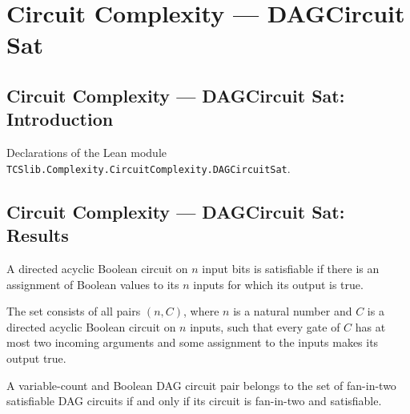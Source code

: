 \section{Circuit Complexity --- DAGCircuit Sat}
\subsection*{Circuit Complexity --- DAGCircuit Sat: Introduction}

Declarations of the Lean module \texttt{TCSlib.Complexity.CircuitComplexity.DAGCircuitSat}.

\subsection*{Circuit Complexity --- DAGCircuit Sat: Results}

\begin{definition}
\label{BoolCircuit.DAGCircuit.Satisfiable}
\leanok
{}
A directed acyclic Boolean circuit on $n$ input bits is satisfiable if there is an
assignment of Boolean values to its $n$ inputs for which its output is true.
\end{definition}

\begin{definition}
\label{BoolCircuit.dagCktSat}
\leanok
{}
The set consists of all pairs $(n,C)$, where $n$ is a natural number and $C$ is a
directed acyclic Boolean circuit on $n$ inputs, such that every gate of $C$ has at most
two incoming arguments and some assignment to the inputs makes its output true.
\end{definition}

\begin{theorem}
\label{BoolCircuit.mem_dagCktSat_iff}
\leanok
{}
A variable-count and Boolean DAG circuit pair belongs to the set of fan-in-two
satisfiable DAG circuits if and only if its circuit is fan-in-two and satisfiable.
\end{theorem}

